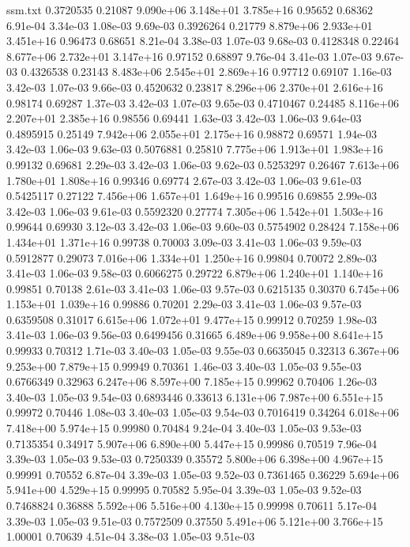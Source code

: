 \begin{filecontents}{ssm.txt}
0.3720535 0.21087 9.090e+06 3.148e+01 3.785e+16 0.95652 0.68362 6.91e-04 3.34e-03 1.08e-03 9.69e-03
0.3926264 0.21779 8.879e+06 2.933e+01 3.451e+16 0.96473 0.68651 8.21e-04 3.38e-03 1.07e-03 9.68e-03
0.4128348 0.22464 8.677e+06 2.732e+01 3.147e+16 0.97152 0.68897 9.76e-04 3.41e-03 1.07e-03 9.67e-03
0.4326538 0.23143 8.483e+06 2.545e+01 2.869e+16 0.97712 0.69107 1.16e-03 3.42e-03 1.07e-03 9.66e-03
0.4520632 0.23817 8.296e+06 2.370e+01 2.616e+16 0.98174 0.69287 1.37e-03 3.42e-03 1.07e-03 9.65e-03
0.4710467 0.24485 8.116e+06 2.207e+01 2.385e+16 0.98556 0.69441 1.63e-03 3.42e-03 1.06e-03 9.64e-03
0.4895915 0.25149 7.942e+06 2.055e+01 2.175e+16 0.98872 0.69571 1.94e-03 3.42e-03 1.06e-03 9.63e-03
0.5076881 0.25810 7.775e+06 1.913e+01 1.983e+16 0.99132 0.69681 2.29e-03 3.42e-03 1.06e-03 9.62e-03
0.5253297 0.26467 7.613e+06 1.780e+01 1.808e+16 0.99346 0.69774 2.67e-03 3.42e-03 1.06e-03 9.61e-03
0.5425117 0.27122 7.456e+06 1.657e+01 1.649e+16 0.99516 0.69855 2.99e-03 3.42e-03 1.06e-03 9.61e-03
0.5592320 0.27774 7.305e+06 1.542e+01 1.503e+16 0.99644 0.69930 3.12e-03 3.42e-03 1.06e-03 9.60e-03
0.5754902 0.28424 7.158e+06 1.434e+01 1.371e+16 0.99738 0.70003 3.09e-03 3.41e-03 1.06e-03 9.59e-03
0.5912877 0.29073 7.016e+06 1.334e+01 1.250e+16 0.99804 0.70072 2.89e-03 3.41e-03 1.06e-03 9.58e-03
0.6066275 0.29722 6.879e+06 1.240e+01 1.140e+16 0.99851 0.70138 2.61e-03 3.41e-03 1.06e-03 9.57e-03
0.6215135 0.30370 6.745e+06 1.153e+01 1.039e+16 0.99886 0.70201 2.29e-03 3.41e-03 1.06e-03 9.57e-03
0.6359508 0.31017 6.615e+06 1.072e+01 9.477e+15 0.99912 0.70259 1.98e-03 3.41e-03 1.06e-03 9.56e-03
0.6499456 0.31665 6.489e+06 9.958e+00 8.641e+15 0.99933 0.70312 1.71e-03 3.40e-03 1.05e-03 9.55e-03
0.6635045 0.32313 6.367e+06 9.253e+00 7.879e+15 0.99949 0.70361 1.46e-03 3.40e-03 1.05e-03 9.55e-03
0.6766349 0.32963 6.247e+06 8.597e+00 7.185e+15 0.99962 0.70406 1.26e-03 3.40e-03 1.05e-03 9.54e-03
0.6893446 0.33613 6.131e+06 7.987e+00 6.551e+15 0.99972 0.70446 1.08e-03 3.40e-03 1.05e-03 9.54e-03
0.7016419 0.34264 6.018e+06 7.418e+00 5.974e+15 0.99980 0.70484 9.24e-04 3.40e-03 1.05e-03 9.53e-03
0.7135354 0.34917 5.907e+06 6.890e+00 5.447e+15 0.99986 0.70519 7.96e-04 3.39e-03 1.05e-03 9.53e-03
0.7250339 0.35572 5.800e+06 6.398e+00 4.967e+15 0.99991 0.70552 6.87e-04 3.39e-03 1.05e-03 9.52e-03
0.7361465 0.36229 5.694e+06 5.941e+00 4.529e+15 0.99995 0.70582 5.95e-04 3.39e-03 1.05e-03 9.52e-03
0.7468824 0.36888 5.592e+06 5.516e+00 4.130e+15 0.99998 0.70611 5.17e-04 3.39e-03 1.05e-03 9.51e-03
0.7572509 0.37550 5.491e+06 5.121e+00 3.766e+15 1.00001 0.70639 4.51e-04 3.38e-03 1.05e-03 9.51e-03

\end{filecontents}
